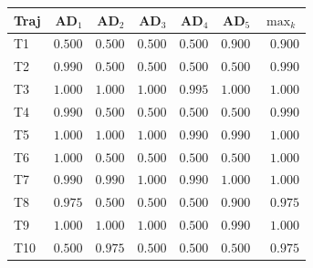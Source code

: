 \small
\setlength{\tabcolsep}{6pt}
\begin{tabular}{lrrrrrr}
\toprule
Traj & AD$_{1}$ & AD$_{2}$ & AD$_{3}$ & AD$_{4}$ & AD$_{5}$ & $\max_{k}$ \\
\midrule
T1  & $0.500$ & $0.500$ & $0.500$ & $0.500$ & $0.900$ & $\mathbf{0.900}$ \\
T2  & $0.990$ & $0.500$ & $0.500$ & $0.500$ & $0.500$ & $\mathbf{0.990}$ \\
T3  & $1.000$ & $1.000$ & $1.000$ & $0.995$ & $1.000$ & $\mathbf{1.000}$ \\
T4  & $0.990$ & $0.500$ & $0.500$ & $0.500$ & $0.500$ & $\mathbf{0.990}$ \\
T5  & $1.000$ & $1.000$ & $1.000$ & $0.990$ & $0.990$ & $\mathbf{1.000}$ \\
T6  & $1.000$ & $0.500$ & $0.500$ & $0.500$ & $0.500$ & $\mathbf{1.000}$ \\
T7  & $0.990$ & $0.990$ & $1.000$ & $0.990$ & $1.000$ & $\mathbf{1.000}$ \\
T8  & $0.975$ & $0.500$ & $0.500$ & $0.500$ & $0.900$ & $\mathbf{0.975}$ \\
T9  & $1.000$ & $1.000$ & $1.000$ & $0.500$ & $0.990$ & $\mathbf{1.000}$ \\
T10 & $0.500$ & $0.975$ & $0.500$ & $0.500$ & $0.500$ & $\mathbf{0.975}$ \\
\bottomrule
\end{tabular}
